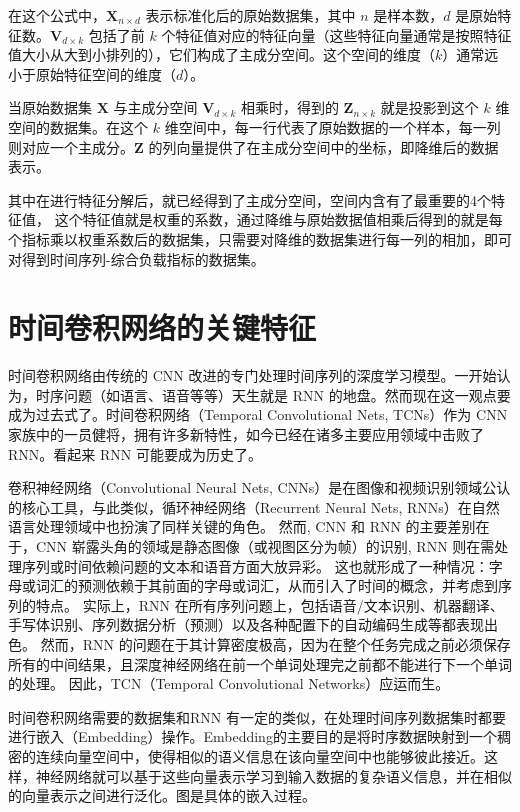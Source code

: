 在这个公式中，$\mathbf{X}_{n \times d}$ 表示标准化后的原始数据集，其中 $n$ 是样本数，$d$ 是原始特征数。$\mathbf{V}_{d \times k}$ 包括了前 $k$ 个特征值对应的特征向量（这些特征向量通常是按照特征值大小从大到小排列的），它们构成了主成分空间。这个空间的维度（$k$）通常远小于原始特征空间的维度（$d$）。

当原始数据集 $\mathbf{X}$ 与主成分空间 $\mathbf{V}_{d \times k}$ 相乘时，得到的 $\mathbf{Z}_{n \times k}$ 就是投影到这个 $k$ 维空间的数据集。在这个 $k$ 维空间中，每一行代表了原始数据的一个样本，每一列则对应一个主成分。$\mathbf{Z}$ 的列向量提供了在主成分空间中的坐标，即降维后的数据表示。

其中在进行特征分解后，就已经得到了主成分空间，空间内含有了最重要的4个特征值，
这个特征值就是权重的系数，通过降维与原始数据值相乘后得到的就是每个指标乘以权重系数后的数据集，只需要对降维的数据集进行每一列的相加，即可对得到时间序列-综合负载指标的数据集。

\section{时间卷积网络的关键特征}
时间卷积网络由传统的 CNN 改进的专门处理时间序列的深度学习模型\cite{lea2016temporal}。一开始认为，时序问题（如语言、语音等等）天生就是 RNN 的地盘。然而现在这一观点要成为过去式了。时间卷积网络（Temporal Convolutional Nets, TCNs）作为 CNN 家族中的一员健将，拥有许多新特性，如今已经在诸多主要应用领域中击败了 RNN。看起来 RNN 可能要成为历史了。

卷积神经网络（Convolutional Neural Nets, CNNs）是在图像和视频识别领域公认的核心工具，与此类似，循环神经网络（Recurrent Neural Nets, RNNs）在自然语言处理领域中也扮演了同样关键的角色。
然而, CNN 和 RNN 的主要差别在于，CNN 崭露头角的领域是静态图像（或视图区分为帧）的识别, RNN 则在需处理序列或时间依赖问题的文本和语音方面大放异彩。
这也就形成了一种情况：字母或词汇的预测依赖于其前面的字母或词汇，从而引入了时间的概念，并考虑到序列的特点。
实际上，RNN 在所有序列问题上，包括语音/文本识别、机器翻译、手写体识别、序列数据分析（预测）以及各种配置下的自动编码生成等都表现出色。
然而，RNN 的问题在于其计算密度极高，因为在整个任务完成之前必须保存所有的中间结果，且深度神经网络在前一个单词处理完之前都不能进行下一个单词的处理。
因此，TCN（Temporal Convolutional Networks）应运而生。

时间卷积网络需要的数据集和RNN 有一定的类似，在处理时间序列数据集时都要进行嵌入（Embedding）操作。Embedding的主要目的是将时序数据映射到一个稠密的连续向量空间中，使得相似的语义信息在该向量空间中也能够彼此接近。这样，神经网络就可以基于这些向量表示学习到输入数据的复杂语义信息，并在相似的向量表示之间进行泛化。图是具体的嵌入过程。

